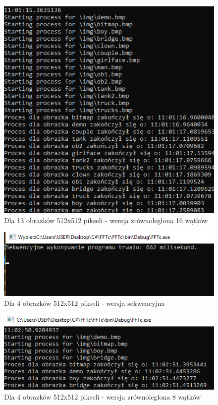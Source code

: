 \begin{figure}[ht]
	\includegraphics[width=\textwidth]{figures/Par13Wat16.png}
	\centering
	\caption{Dla 13 obrazków 512x512 pikseli - wersja zrównoleglona 16 wątków}
\end{figure}

\begin{figure}[ht]
	\includegraphics[width=\textwidth]{figures/Seq4.png}
	\centering
	\caption{Dla 4 obrazków 512x512 pikseli - wersja sekwencyjna}
\end{figure}
\begin{figure}[ht]
	\includegraphics[width=\textwidth]{figures/Par4Wat8.png}
	\centering
	\caption{Dla 4 obrazków 512x512 pikseli - wersja zrównoleglona 8 wątków}
\end{figure}

